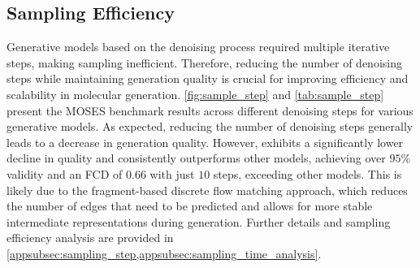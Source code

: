 

\subsection{Sampling Efficiency} 
\label{sec:sampling_efficiency}



Generative models based on the denoising process required multiple iterative steps, making sampling inefficient.
Therefore, reducing the number of denoising steps while maintaining generation quality is crucial for improving efficiency and scalability in molecular generation.  
\cref{fig:sample_step} and \cref{tab:sample_step} present the MOSES benchmark results across different denoising steps for various generative models.
As expected, reducing the number of denoising steps generally leads to a decrease in generation quality.
However, \methodname{} exhibits a significantly lower decline in quality and consistently outperforms other models, achieving over $95\%$validity and an FCD of $0.66$ with just $10$ steps, exceeding other models. 
This is likely due to the fragment-based discrete flow matching approach, which reduces the number of edges that need to be predicted and allows for more stable intermediate representations during generation.
Further details and sampling efficiency analysis are provided in \cref{appsubsec:sampling_step,appsubsec:sampling_time_analysis}.


